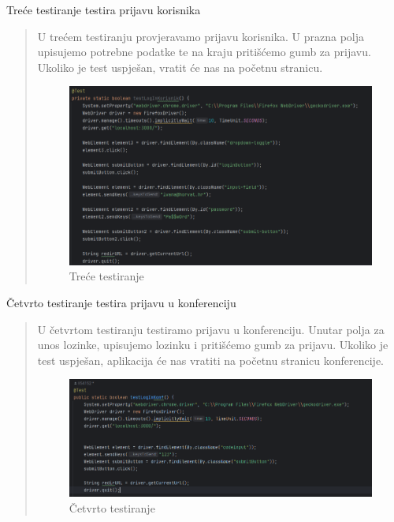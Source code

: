 \begin{packed_enum}
				\item Treće testiranje testira prijavu korisnika
				\begin{quote}
					U trećem testiranju provjeravamo prijavu korisnika. U prazna polja upisujemo potrebne podatke te na kraju pritišćemo gumb za prijavu. Ukoliko je test uspješan, vratit će nas na početnu stranicu.
					\begin{figure}[H]
						\includegraphics[width=\textwidth]{slike/Selenium3.png} %
						\caption{Treće testiranje}
						\label{fig:Selenium3} %
					\end{figure}
				\end{quote}
				
				\item Četvrto testiranje testira prijavu u konferenciju 
				\begin{quote}
					U četvrtom testiranju testiramo prijavu u konferenciju. Unutar polja za unos lozinke, upisujemo lozinku i pritišćemo gumb za prijavu. Ukoliko je test uspješan, aplikacija će nas vratiti na početnu stranicu konferencije.
					\begin{figure}[H]
						\includegraphics[width=\textwidth]{slike/Selenium4.png} %
						\caption{Četvrto testiranje}
						\label{fig:Selenium4} %
					\end{figure}
				\end{quote}
				
			\end{packed_enum}
			
